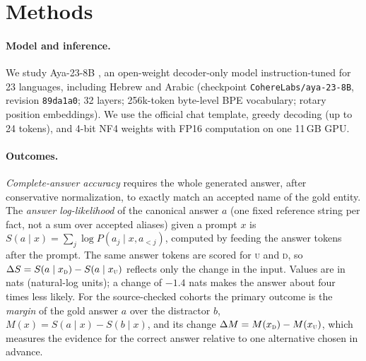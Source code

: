 \documentclass[11pt]{article}
\newcommand{\U}{\textsc{u}}
\newcommand{\D}{\textsc{d}}
\begin{document}
\section{Methods}
\label{sec:methods}

\paragraph{Model and inference.}
We study Aya-23-8B \citep{aryabumi-etal-2024-aya23}, an open-weight decoder-only
model instruction-tuned for 23 languages, including Hebrew and Arabic
(checkpoint \texttt{CohereLabs/aya-23-8B}, revision \texttt{89da1a0}; 32 layers;
256k-token byte-level BPE vocabulary; rotary position embeddings). We use the official chat template, greedy decoding (up to 24 tokens), and 4-bit NF4 weights with FP16 computation
\citep{dettmers-etal-2023-qlora} on one 11\,GB GPU.

\paragraph{Outcomes.}
\emph{Complete-answer accuracy} requires the whole generated answer, after
conservative normalization, to exactly match an accepted name of the gold
entity. The
\emph{answer log-likelihood} of the canonical answer $a$ (one fixed reference
string per fact, not a sum over accepted aliases) given a prompt $x$ is
$S(a\mid x)=\sum_{j}\log P(a_j\mid x,a_{<j})$, computed by feeding the answer
tokens after the prompt. The same answer tokens are scored for \U{} and \D{}, so
$\Delta S=S(a\mid x_\D)-S(a\mid x_\U)$ reflects only the change in the input.
Values are in nats (natural-log units); a change of $-1.4$ nats makes the answer
about four times less likely. For the source-checked cohorts the primary outcome
is the \emph{margin} of the gold answer $a$ over the distractor $b$,
$M(x)=S(a\mid x)-S(b\mid x)$, and its change $\Delta M=M(x_\D)-M(x_\U)$, which
measures the evidence for the correct answer relative to one alternative chosen
in advance.
\end{document}
